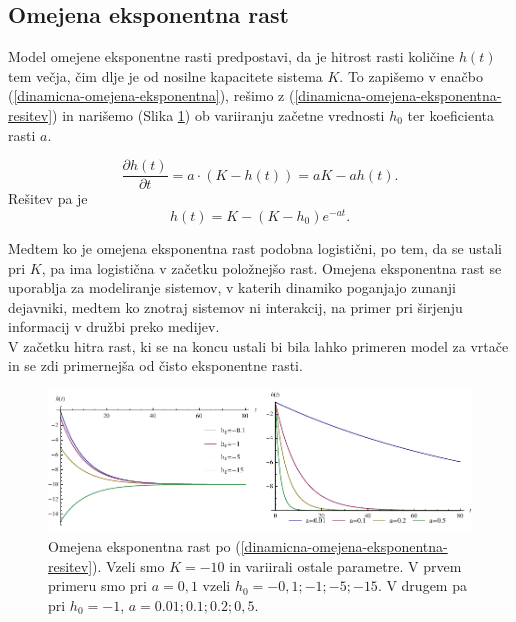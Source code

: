 \documentclass[a4paper, twoside, 12pt]{book}
\begin{document}
\subsection{Omejena eksponentna rast}

Model omejene eksponentne rasti predpostavi, da je hitrost rasti količine $h(t)$ tem večja, čim dlje je od nosilne kapacitete sistema $K$. To zapišemo v enačbo (\ref{dinamicna-omejena-eksponentna}), rešimo z (\ref{dinamicna-omejena-eksponentna-resitev}) in narišemo (Slika \ref{fig:omejena-eksponentna-rast}) ob variiranju začetne vrednosti $h_0$ ter koeficienta rasti $a$.

    \begin{equation}
      \frac{\partial h(t)}{\partial t} = a \cdot ( K - h(t) ) = a K - a h(t).
      \label{dinamicna-omejena-eksponentna}
    \end{equation}
Rešitev pa je
    \begin{equation}
      h(t) = K - (K - h_0) e^{-a t}.
      \label{dinamicna-omejena-eksponentna-resitev}
    \end{equation}

    Medtem ko je omejena eksponentna rast podobna logistični, po tem, da se ustali pri $K$, pa ima logistična v začetku položnejšo rast. Omejena eksponentna rast se uporablja za modeliranje sistemov, v katerih dinamiko poganjajo zunanji dejavniki, medtem ko znotraj sistemov ni interakcij, na primer pri širjenju informacij v družbi preko medijev.\\
V začetku hitra rast, ki se na koncu ustali bi bila lahko primeren model za vrtače in se zdi primernejša od čisto eksponentne rasti.

    \begin{figure}[h]
      \begin{center}
        \includegraphics[width=14cm]{slike/omejena-eksponentna-rast}
      \end{center}
      \caption{Omejena eksponentna rast po (\ref{dinamicna-omejena-eksponentna-resitev}). Vzeli smo $K=-10$ in variirali ostale parametre. V prvem primeru smo pri $a=0,1$ vzeli $h_0=-0,1;-1;-5;-15$. V drugem pa pri $h_0=-1$, $a=0.01;0.1;0.2;0,5$.}
      \label{fig:omejena-eksponentna-rast}
    \end{figure}
\end{document}
